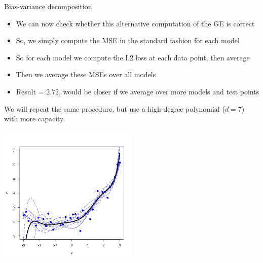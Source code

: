 \documentclass[11pt,compress,t,notes=noshow, xcolor=table]{beamer}
\begin{document}
\begin{vbframe} {Bias-variance decomposition}
\begin{footnotesize}
\begin{itemize}
  \item We can now check whether this alternative computation of the GE is correct
  \item So, we simply compute the MSE in the standard fashion for each model
  \item So for each model we compute the L2 loss at each data point, then average
  \item Then we average these MSEs over all models
  \item Result = 2.72, would be closer if we average over more models and test points 
\end{itemize}

\end{footnotesize}


\framebreak


We will repeat the same procedure, but use a high-degree polynomial ($d=7$) with more capacity.

\begin{center}
  \includegraphics[width = 0.5\textwidth]{figure/bias_variance_decomposition-complex_model.png}
\end{center}


\framebreak


\end{vbframe}
\end{document}
